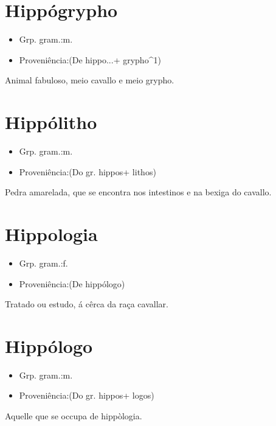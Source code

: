\documentclass{article}
\begin{document}
\section{Hippógrypho}
\begin{itemize}
\item {Grp. gram.:m.}
\end{itemize}
\begin{itemize}
\item {Proveniência:(De \textunderscore hippo...\textunderscore  + \textunderscore grypho\textunderscore ^1)}
\end{itemize}
Animal fabuloso, meio cavallo e meio grypho.
\section{Hippólitho}
\begin{itemize}
\item {Grp. gram.:m.}
\end{itemize}
\begin{itemize}
\item {Proveniência:(Do gr. \textunderscore hippos\textunderscore  + \textunderscore lithos\textunderscore )}
\end{itemize}
Pedra amarelada, que se encontra nos intestinos e na bexiga do cavallo.
\section{Hippologia}
\begin{itemize}
\item {Grp. gram.:f.}
\end{itemize}
\begin{itemize}
\item {Proveniência:(De \textunderscore hippólogo\textunderscore )}
\end{itemize}
Tratado ou estudo, á cêrca da raça cavallar.
\section{Hippólogo}
\begin{itemize}
\item {Grp. gram.:m.}
\end{itemize}
\begin{itemize}
\item {Proveniência:(Do gr. \textunderscore hippos\textunderscore  + \textunderscore logos\textunderscore )}
\end{itemize}
Aquelle que se occupa de hippòlogia.
\end{document}

